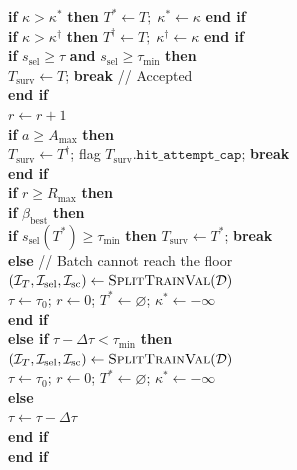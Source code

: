 \documentclass[11pt,a4paper]{article}
\newcommand{\code}[1]{\texttt{#1}}
\newcommand{\algkw}[1]{\textbf{#1}}
\newcommand{\algfn}[1]{\textsc{#1}}
\newcommand{\algcm}[1]{\quad\textcolor{MutedGray}{\footnotesize // #1}}
\begin{document}
\begin{algorithm}[htbp]
\begin{tabbing}
    \> \> \algkw{if} $\kappa > \kappa^*$ \algkw{then} $T^* \gets T; \; \kappa^* \gets \kappa$ \algkw{end if} \\
    \> \> \algkw{if} $\kappa > \kappa^{\dagger}$ \algkw{then} $T^{\dagger} \gets T; \; \kappa^{\dagger} \gets \kappa$ \algkw{end if} \\[2pt]
    \> \> \algkw{if} $s_{\text{sel}} \ge \tau$ \algkw{and} $s_{\text{sel}} \ge \tau_{\min}$ \algkw{then} \\
    \> \> \> $T_{\text{surv}} \gets T$; \algkw{break} \algcm{Accepted} \\
    \> \> \algkw{end if} \\[2pt]
    \> \> $r \gets r + 1$ \\
    \> \> \algkw{if} $a \ge A_{\max}$ \algkw{then} \\
    \> \> \> $T_{\text{surv}} \gets T^{\dagger}$; flag $T_{\text{surv}}.\code{hit\_attempt\_cap}$; \algkw{break} \\
    \> \> \algkw{end if} \\
    \> \> \algkw{if} $r \ge R_{\max}$ \algkw{then} \\
    \> \> \> \algkw{if} $\beta_{\text{best}}$ \algkw{then} \\
    \> \> \> \> \algkw{if} $s_{\text{sel}}(T^*) \ge \tau_{\min}$ \algkw{then} $T_{\text{surv}} \gets T^*$; \algkw{break} \\
    \> \> \> \> \algkw{else} \algcm{Batch cannot reach the floor} \\
    \> \> \> \> \> $(\mathcal{I}_T, \mathcal{I}_{\text{sel}}, \mathcal{I}_{\text{sc}}) \gets \text{\algfn{SplitTrainVal}}(\mathcal{D})$ \\
    \> \> \> \> \> $\tau \gets \tau_0$; $r \gets 0$; $T^* \gets \varnothing$; $\kappa^* \gets -\infty$ \\
    \> \> \> \> \algkw{end if} \\
    \> \> \> \algkw{else if} $\tau - \Delta\tau < \tau_{\min}$ \algkw{then} \\
    \> \> \> \> $(\mathcal{I}_T, \mathcal{I}_{\text{sel}}, \mathcal{I}_{\text{sc}}) \gets \text{\algfn{SplitTrainVal}}(\mathcal{D})$ \\
    \> \> \> \> $\tau \gets \tau_0$; $r \gets 0$; $T^* \gets \varnothing$; $\kappa^* \gets -\infty$ \\
    \> \> \> \algkw{else} \\
    \> \> \> \> $\tau \gets \tau - \Delta\tau$ \\
    \> \> \> \algkw{end if} \\
    \> \> \algkw{end if} \\

\end{tabbing}
\end{algorithm}
\end{document}
